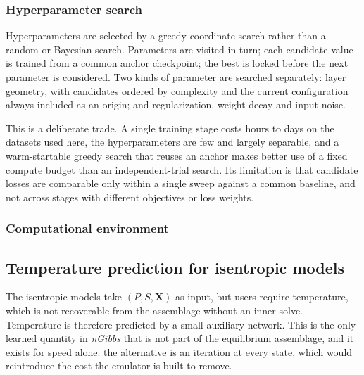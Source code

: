 \subsubsection{Hyperparameter search}
\label{sec:hpsearch}

Hyperparameters are selected by a greedy coordinate search rather than a random or
Bayesian search. Parameters are visited in turn; each candidate value is trained from
a common anchor checkpoint; the best is locked before the next parameter is
considered. Two kinds of parameter are searched separately: layer geometry, with
candidates ordered by complexity and the current configuration always included as an
origin; and regularization, weight decay and input noise.

This is a deliberate trade. A single training stage costs hours to days on the
datasets used here, the hyperparameters are few and largely separable, and a
warm-startable greedy search that reuses an anchor makes better use of a fixed compute
budget than an independent-trial search. Its limitation is that candidate losses are
comparable only within a single sweep against a common baseline, and not across
stages with different objectives or loss weights.

\subsubsection{Computational environment}


\subsection{Temperature prediction for isentropic models}
\label{sec:temperature}

The isentropic models take $(P,S,\mathbf{X})$ as input, but users require
temperature, which is not recoverable from the assemblage without an inner solve.
Temperature is therefore predicted by a small auxiliary network. This is the only
learned quantity in \emph{nGibbs} that is not part of the equilibrium assemblage, and
it exists for speed alone: the alternative is an iteration at every state, which would
reintroduce the cost the emulator is built to remove.

